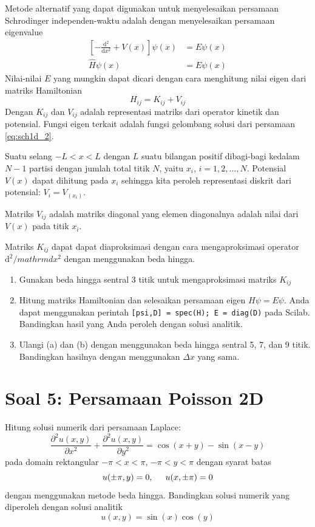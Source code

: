 \documentclass[12pt,bahasa]{article}
\begin{document}
Metode alternatif
yang dapat digunakan untuk menyelesaikan persamaan
Schrodinger independen-waktu adalah dengan menyelesaikan
persamaan eigenvalue
\begin{align}
\left[-\frac{\mathrm{d}^2}{\mathrm{d}x^2} + V(x)\right]\psi(x) & = E\psi(x) \\
\hat{H}\psi(x) & = E \psi(x)
\end{align}
Nilai-nilai $E$ yang mungkin dapat dicari dengan cara menghitung
nilai eigen dari matriks Hamiltonian 
\begin{equation}
H_{ij} = K_{ij} + V_{ij}
\end{equation}
Dengan $K_{ij}$ dan $V_{ij}$ adalah representasi matriks dari operator
kinetik dan potensial.
Fungsi eigen terkait adalah fungsi gelombang solusi dari
persamaan \eqref{eq:sch1d_2}.

Suatu selang $-L < x < L$ dengan $L$ suatu bilangan positif
dibagi-bagi kedalam $N-1$ partisi dengan jumlah total titik $N$,
yaitu $x_{i}$, $i = 1, 2, \ldots, N$.
Potensial $V(x)$ dapat dihitung pada $x_{i}$ sehingga
kita peroleh representasi diskrit dari potensial:
$V_{i} = V_(x_{i})$.

Matriks $V_{ij}$ adalah matriks diagonal yang elemen diagonalnya adalah
nilai dari $V(x)$ pada titik $x_{i}$.

Matriks $K_{ij}$ dapat
dapat diaproksimasi dengan cara mengaproksimasi operator $\mathrm{d}^2/mathrm{d}x^2$
dengan menggunakan beda hingga.

\begin{enumerate}[label=(\alph*)]
\item Gunakan beda hingga sentral 3 titik untuk mengaproksimasi matriks $K_{ij}$
\item Hitung matriks Hamiltonian dan selesaikan persamaan eigen $H\psi = E\psi$. Anda dapat
menggunakan perintah \texttt{[psi,D] = spec(H); E = diag(D)} pada Scilab.
Bandingkan hasil yang Anda peroleh dengan solusi analitik.
\item Ulangi (a) dan (b) dengan menggunakan beda hingga sentral 5, 7, dan 9 titik.
Bandingkan hasilnya dengan menggunakan $\Delta x$ yang sama.
\end{enumerate}


\section{Soal 5: Persamaan Poisson 2D}

Hitung solusi numerik dari persamaan Laplace:
\begin{equation}
\frac{\partial^2 u(x,y)}{\partial x^2} +
\frac{\partial^2 u(x,y)}{\partial y^2} = \cos(x + y) - \sin(x - y)
\end{equation}
pada domain rektangular $-\pi < x < \pi$, $-\pi < y < \pi$ dengan syarat batas
\begin{equation}
u(\pm\pi,y) = 0, \hspace{0.5cm} u(x,\pm\pi) = 0
\end{equation}
dengan menggunakan metode beda hingga. Bandingkan solusi numerik yang diperoleh dengan
solusi analitik
\begin{equation}
u(x,y) = \sin(x)\cos(y)
\end{equation}
\end{document}
